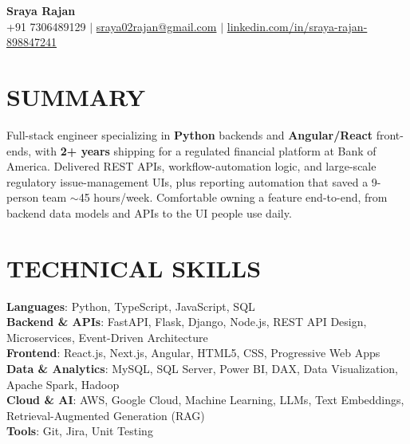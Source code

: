 \documentclass[letterpaper,11pt]{article}
\begin{document}

\begin{center}
  \textbf{\huge Sraya Rajan} \\ \vspace{3pt}
  \small {\headerfont +91 7306489129} {\scriptsize $|$}
  {\headerfont \href{mailto:sraya02rajan@gmail.com}{sraya02rajan@gmail.com}} {\scriptsize $|$}
  {\headerfont \href{https://www.linkedin.com/in/sraya-rajan-898847241}{linkedin.com/in/sraya-rajan-898847241}}
\end{center}

\section{SUMMARY}
\begin{justify}
\small{
Full-stack engineer specializing in \textbf{Python} backends and \textbf{Angular/React} front-ends, with \textbf{2+ years} shipping for a regulated financial platform at Bank of America. Delivered REST APIs, workflow-automation logic, and large-scale regulatory issue-management UIs, plus reporting automation that saved a 9-person team $\sim$45 hours/week. Comfortable owning a feature end-to-end, from backend data models and APIs to the UI people use daily.
}
\end{justify}

\section{TECHNICAL SKILLS}
\begin{itemize}[leftmargin=0in, label={}, itemsep=0pt, parsep=0pt]
    \small{
      \item{
        \textbf{Languages}{: Python, TypeScript, JavaScript, SQL}\vspace{2pt} \\
        \textbf{Backend \& APIs}{: FastAPI, Flask, Django, Node.js, REST API Design, Microservices, Event-Driven Architecture}\vspace{2pt} \\
        \textbf{Frontend}{: React.js, Next.js, Angular, HTML5, CSS, Progressive Web Apps}\vspace{2pt} \\
        \textbf{Data \& Analytics}{: MySQL, SQL Server, Power BI, DAX, Data Visualization, Apache Spark, Hadoop}\vspace{2pt} \\
        \textbf{Cloud \& AI}{: AWS, Google Cloud, Machine Learning, LLMs, Text Embeddings, Retrieval-Augmented Generation (RAG)}\vspace{2pt} \\
        \textbf{Tools}{: Git, Jira, Unit Testing}
      }
    }
\end{itemize}
\end{document}
